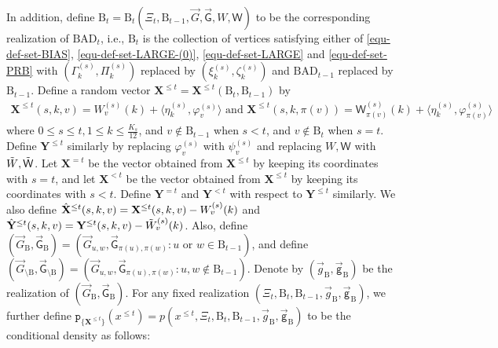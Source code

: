 \documentclass[11pt]{article}
\numberwithin{equation}{section}
\begin{document}
In addition, define $\mathrm{B}_t= \mathrm{B}_t ( \Xi_{t}, \mathrm{B}_{t-1}, \overrightarrow{G}, \overrightarrow{\mathsf{G}}, W, \mathsf{W} )$ to be the corresponding realization of $\mathrm{BAD}_t$, i.e., $\mathrm{B}_t$ is the collection of vertices satisfying either of \eqref{equ-def-set-BIAS}, \eqref{equ-def-set-LARGE-(0)}, \eqref{equ-def-set-LARGE} and \eqref{equ-def-set-PRB} with $(\Gamma^{(s)}_k, \Pi^{(s)}_k)$ replaced by $(\xi^{(s)}_k, \zeta^{(s)}_k)$ and $\mathrm{BAD}_{t-1}$ replaced by $\mathrm{B}_{t-1}$. Define a random vector $\mathbf{X}^{\leq t} = \mathbf{X}^{ \leq t } (\mathrm{B}_t, \mathrm{B}_{t-1})$ by 
\begin{align*}
    \mathbf{X}^{\leq t} (s,k,v) = W^{(s)}_v (k) + \langle \eta^{(s)}_k, \varphi^{(s)}_v \rangle \mbox{ and } \mathbf{X}^{\leq t} (s,k,\pi(v)) = \mathsf{W}^{(s)}_{\pi(v)} (k) + \langle \eta^{(s)}_k, \varphi^{(s)}_{\pi(v)} \rangle
\end{align*}
where $0 \leq s \leq t, 1 \leq k \leq \frac{K_s}{12}$, and $v \not \in \mathrm{B}_{t-1}$ when $s < t$, and $v \not \in \mathrm{B}_{t}$ when $s=t$. Define $\mathbf{Y}^{\leq t}$ similarly by replacing $\varphi^{(s)}_v$ with $\psi^{(s)}_v$ and replacing $W,\mathsf{W}$ with $\Tilde{W},\Tilde{\mathsf{W}}$. Let $\mathbf X^{=t}$ be the vector obtained from $\mathbf X^{\leq t}$ by keeping its coordinates with $s = t$, and let $\mathbf X^{<t}$ be the vector obtained from $\mathbf X^{\leq t}$ by keeping its coordinates with $s <t$. Define $\mathbf{Y}^{=t}$ and $\mathbf{Y}^{<t}$ with respect to $\mathbf{Y}^{\leq t}$ similarly. We also define $\Hat{\mathbf{X}}^{\leq t} (s,k,v) = \mathbf{X}^{\leq t} (s,k,v) - W^{(s)}_v (k)$ and $\Hat{\mathbf{Y}}^{\leq t} (s,k,v) = \mathbf{Y}^{\leq t} (s,k,v) - \Tilde{W}^{(s)}_v (k)$. Also, define $(\overrightarrow{G}_{\mathrm{B}}, \overrightarrow{\mathsf{G}}_{\mathrm{B}}) = (\overrightarrow{G}_{u,w}, \overrightarrow{\mathsf{G}}_{\pi(u),\pi(w)} : u \mbox{ or } w \in \mathrm{B}_{t-1})$, and define $(\overrightarrow{G}_{\setminus \mathrm{B}}, \overrightarrow{\mathsf{G}}_{\setminus \mathrm{B}}) = (\overrightarrow{G}_{u,w}, \overrightarrow{\mathsf{G}}_{\pi(u),\pi(w)} : u,w \not \in \mathrm{B}_{t-1})$. Denote by $(\overrightarrow{g}_{\mathrm{B}}, \overrightarrow{\mathsf{g}}_{\mathrm{B}})$  be the realization of $(\overrightarrow{G}_{\mathrm{B}}, \overrightarrow{\mathsf{G}}_{\mathrm{B}})$. For any fixed realization $(\Xi_t, \mathrm{B}_{t}, \mathrm{B}_{t-1}, \overrightarrow{g}_{\mathrm{B}}, \overrightarrow{\mathsf{g}}_{\mathrm{B}})$, we further define $\mathtt{p}_{ \{ \mathbf{X}^{\leq t} \} } (x^{\leq t}) = p( {x}^{\leq t}, \Xi_t, \mathrm{B}_t, \mathrm{B}_{t-1}, \overrightarrow{g}_{\mathrm{B}}, \overrightarrow{\mathsf{g}}_{\mathrm{B}} )$ to be the conditional density as follows:
\end{document}
